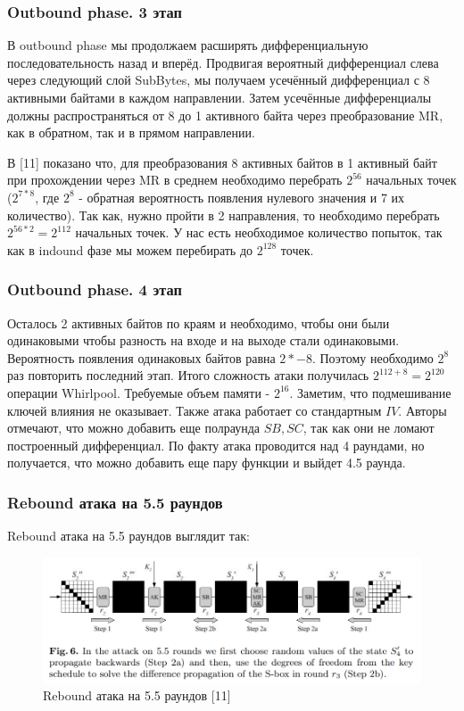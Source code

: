 \documentclass[colorthm]{./civarticle}
\begin{document}
\subsubsection{Outbound phase. 3 этап}
В outbound phase мы продолжаем расширять дифференциальную последовательность назад и вперёд. Продвигая вероятный дифференциал слева через следующий слой SubBytes, мы получаем усечённый дифференциал с 8 активными байтами в каждом направлении. Затем усечённые дифференциалы должны распространяться от 8 до 1 активного байта через преобразование MR, как в обратном, так и в прямом направлении.

В [11] показано что, для преобразования 8 активных байтов в 1 активный байт при прохождении через MR в среднем необходимо перебрать $2^{56}$ начальных точек ($2^{7*8}$, где $2^8$ - обратная вероятность появления нулевого значения и 7 их количество). Так как, нужно пройти в 2 направления, то необходимо перебрать $2^{56*2}=2^{112}$ начальных точек. У нас есть необходимое количество попыток, так как в indound фазе мы можем перебирать до $2^{128}$ точек.

\subsubsection{Outbound phase. 4 этап}
Осталось 2 активных байтов по краям и необходимо, чтобы они были одинаковыми чтобы разность на входе и на выходе стали одинаковыми. Вероятность появления одинаковых байтов равна $2*{-8}$. Поэтому необходимо $2^8$ раз повторить последний этап. Итого сложность атаки получилась $2^{112+8}=2^{120}$ операции Whirlpool. Требуемые объем памяти - $2^{16}$. Заметим, что подмешивание ключей влияния не оказывает. Также атака работает со стандартным $IV$. Авторы отмечают, что можно добавить еще полраунда $SB, SC$, так как они не ломают построенный дифференциал. По факту атака проводится над 4 раундами, но получается, что можно добавить еще пару функции и выйдет 4.5 раунда.

\subsubsection{Rebound атака на 5.5 раундов}

Rebound атака на 5.5 раундов выглядит так:

\begin{figure}[H]
    \centering
    \includegraphics[width=0.75\linewidth]{att_2.png}
    \caption{Rebound атака на 5.5 раундов [11]}
    \label{fig:enter-label}
\end{figure}
\end{document}
